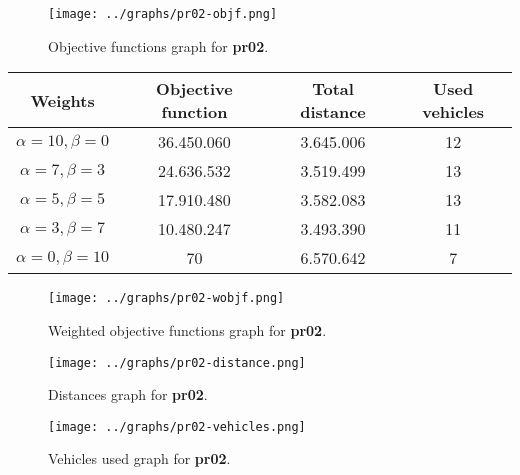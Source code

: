 \begin{figure}[H]
    \centering
    \texttt{[image: ../graphs/pr02-objf.png]}
    \caption{Objective functions graph for \textbf{pr02}.}
\end{figure}
{
\renewcommand{\arraystretch}{2}
\begin{longtable}[h]{| c | c | c | c |}
    \hline
    \textbf{Weights} & \textbf{Objective function} & \textbf{Total distance} & \textbf{Used vehicles} \\
    \hline
    \endhead
    $\alpha = 10, \beta = 0$ & 36.450.060 & 3.645.006 & 12 \\
    \hline
    $\alpha = 7, \beta = 3$  & 24.636.532 & 3.519.499 & 13 \\
    \hline
    $\alpha = 5, \beta = 5$  & 17.910.480 & 3.582.083 & 13 \\
    \hline
    $\alpha = 3, \beta = 7$  & 10.480.247 & 3.493.390 & 11 \\
    \hline
    $\alpha = 0, \beta = 10$ &         70 & 6.570.642 &  7 \\
    \hline
\end{longtable}
}
\begin{figure}[H]
    \centering
    \texttt{[image: ../graphs/pr02-wobjf.png]}
    \caption{Weighted objective functions graph for \textbf{pr02}.}
\end{figure}

\begin{figure}[H]
    \centering
    \texttt{[image: ../graphs/pr02-distance.png]}
    \caption{Distances graph for \textbf{pr02}.}
\end{figure}

\begin{figure}[H]
    \centering
    \texttt{[image: ../graphs/pr02-vehicles.png]}
    \caption{Vehicles used graph for \textbf{pr02}.}
\end{figure}

\newpage